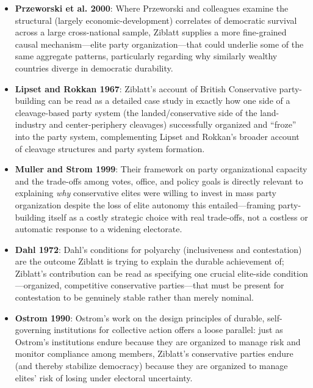 \documentclass[12pt]{article}
\begin{document}
\begin{itemize}[leftmargin=*, itemsep=4pt]
    \item \textbf{Przeworski et al. 2000}: Where Przeworski and colleagues examine the structural (largely economic-development) correlates of democratic survival across a large cross-national sample, Ziblatt supplies a more fine-grained causal mechanism---elite party organization---that could underlie some of the same aggregate patterns, particularly regarding why similarly wealthy countries diverge in democratic durability.
    \item \textbf{Lipset and Rokkan 1967}: Ziblatt's account of British Conservative party-building can be read as a detailed case study in exactly how one side of a cleavage-based party system (the landed/conservative side of the land-industry and center-periphery cleavages) successfully organized and ``froze'' into the party system, complementing Lipset and Rokkan's broader account of cleavage structures and party system formation.
    \item \textbf{Muller and Strom 1999}: Their framework on party organizational capacity and the trade-offs among votes, office, and policy goals is directly relevant to explaining \emph{why} conservative elites were willing to invest in mass party organization despite the loss of elite autonomy this entailed---framing party-building itself as a costly strategic choice with real trade-offs, not a costless or automatic response to a widening electorate.
    \item \textbf{Dahl 1972}: Dahl's conditions for polyarchy (inclusiveness and contestation) are the outcome Ziblatt is trying to explain the durable achievement of; Ziblatt's contribution can be read as specifying one crucial elite-side condition---organized, competitive conservative parties---that must be present for contestation to be genuinely stable rather than merely nominal.
    \item \textbf{Ostrom 1990}: Ostrom's work on the design principles of durable, self-governing institutions for collective action offers a loose parallel: just as Ostrom's institutions endure because they are organized to manage risk and monitor compliance among members, Ziblatt's conservative parties endure (and thereby stabilize democracy) because they are organized to manage elites' risk of losing under electoral uncertainty.
\end{itemize}
\end{document}
